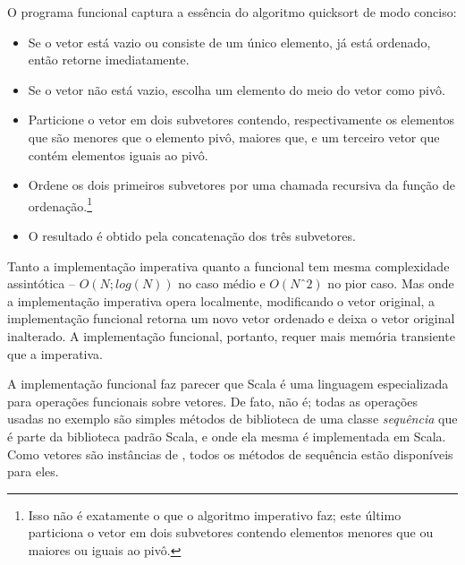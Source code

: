 O programa funcional captura a essência do algoritmo quicksort de modo conciso:
\begin{itemize}
\item Se o vetor está vazio ou consiste de um único elemento, já está ordenado,
      então retorne imediatamente.
\item Se o vetor não está vazio, escolha um elemento do meio do vetor como pivô.
\item Particione o vetor em dois subvetores contendo, respectivamente os elementos
 que são menores que o elemento pivô, maiores que, e um terceiro vetor que contém
 elementos iguais ao pivô.
\item Ordene os dois primeiros subvetores por uma chamada recursiva da função de 
ordenação.\footnote{Isso não é exatamente o que o algoritmo imperativo faz; este 
último particiona o vetor em dois subvetores contendo elementos menores que ou 
maiores ou iguais ao pivô.}
\item O resultado é obtido pela concatenação dos três subvetores.
\end{itemize}

Tanto a implementação imperativa quanto a funcional tem mesma complexidade
assintótica -- $O(N;log(N))$ no caso médio e $O(Nˆ2)$ no pior caso. Mas onde
a implementação imperativa opera localmente, modificando o vetor original,
a implementação funcional retorna um novo vetor ordenado e deixa o vetor
original inalterado. A implementação funcional, portanto, requer mais
memória transiente que a imperativa.

A implementação funcional faz parecer que Scala é uma linguagem
especializada para operações funcionais sobre vetores. De fato, não é;
todas as operações usadas no exemplo são simples métodos de biblioteca
de uma classe {\em sequência}  que é parte da biblioteca
padrão Scala, e onde ela mesma é implementada em Scala. Como vetores são 
instâncias de \verb@Seq@, todos os métodos de sequência estão disponíveis
para eles.

